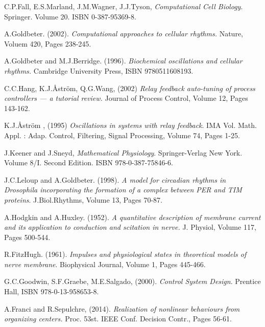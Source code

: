 \documentclass[a4paper, 12pt]{article}
\begin{document}
\begin{thebibliography}{9}


C.P.Fall, E.S.Marland, J.M.Wagner, J.J.Tyson, \emph{Computational Cell Biology}. Springer. Volume 20. ISBN 0-387-95369-8. 

A.Goldbeter. (2002). \emph{Computational approaches to cellular rhythms.} Nature, Voluem 420, Pages 238-245.

A.Goldbeter and M.J.Berridge. (1996). \emph{Biochemical oscillations and cellular rhythms.} Cambridge University Press, ISBN 9780511608193. 

C.C.Hang, K.J.\r{A}str\"{o}m, Q.G.Wang, (2002) \emph{Relay feedback auto-tuning of process controllers --- a tutorial review.} Journal of Process Control, Volume 12, Pages 143-162. 

K.J.\r{A}str\"{o}m , (1995) \emph{Oscillations in systems with relay feedback}. IMA Vol. Math. Appl. : Adap. Control, Filtering, Signal Processing, Volume 74, Pages 1-25. 

J.Keener and J.Sneyd, \emph{Mathematical Physiology}. Springer-Verlag New York. Volume 8/I. Second Edition. ISBN 978-0-387-75846-6. 

J.C.Leloup and A.Goldbeter. (1998). \emph{A model for circadian rhythms in Drosophila incorporating the formation of a complex between PER and TIM proteins}. J.Biol.Rhythms, Volume 13, Pages 70-87. 

A.Hodgkin and A.Huxley. (1952). \emph{A quantitative description of membrane current and its application to conduction and scitation in nerve.} J. Physiol, Volume 117, Pages 500-544.

R.FitzHugh. (1961). \emph{Impulses and physiological states in theoretical models of nerve membrane}. Biophysical Journal, Volume 1, Pages 445-466.

G.C.Goodwin, S.F.Graebe, M.E.Salgado, (2000). \emph{Control System Design}. Prentice Hall, ISBN 978-0-13-958653-8.

A.Franci and R.Sepulchre, (2014). \emph{Realization of nonlinear behaviours from organizing centers.} Proc. 53st. IEEE Conf. Decision Contr., Pages 56-61.


\end{thebibliography}
\end{document}
